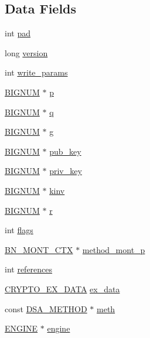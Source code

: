 \subsection*{Data Fields}
\begin{DoxyCompactItemize}
\item 
int \hyperlink{structdsa__st_af1d40a330bc745f51d8b079c9dc473ff}{pad}
\item 
long \hyperlink{structdsa__st_a17afc5cf84cee4b2123665f28ce85c9f}{version}
\item 
int \hyperlink{structdsa__st_a636bec232abffe90c26bde0a196e4c2e}{write\+\_\+params}
\item 
\hyperlink{crypto_2ossl__typ_8h_a6fb19728907ec6515e4bfb716bffa141}{B\+I\+G\+N\+UM} $\ast$ \hyperlink{structdsa__st_a4ed2e531b9fd8a6ca6ad6804565299a7}{p}
\item 
\hyperlink{crypto_2ossl__typ_8h_a6fb19728907ec6515e4bfb716bffa141}{B\+I\+G\+N\+UM} $\ast$ \hyperlink{structdsa__st_a8d39f39e46b024184dc5a24c3901d32d}{q}
\item 
\hyperlink{crypto_2ossl__typ_8h_a6fb19728907ec6515e4bfb716bffa141}{B\+I\+G\+N\+UM} $\ast$ \hyperlink{structdsa__st_ada27d9fb07daaac14be19b4ce12a7400}{g}
\item 
\hyperlink{crypto_2ossl__typ_8h_a6fb19728907ec6515e4bfb716bffa141}{B\+I\+G\+N\+UM} $\ast$ \hyperlink{structdsa__st_aad713005343ebfb84e09a7441d655802}{pub\+\_\+key}
\item 
\hyperlink{crypto_2ossl__typ_8h_a6fb19728907ec6515e4bfb716bffa141}{B\+I\+G\+N\+UM} $\ast$ \hyperlink{structdsa__st_a7a27cca85dea48fc1c9086fe65651ec5}{priv\+\_\+key}
\item 
\hyperlink{crypto_2ossl__typ_8h_a6fb19728907ec6515e4bfb716bffa141}{B\+I\+G\+N\+UM} $\ast$ \hyperlink{structdsa__st_ae572b73b513755f46bd9bb97fb0bdcf3}{kinv}
\item 
\hyperlink{crypto_2ossl__typ_8h_a6fb19728907ec6515e4bfb716bffa141}{B\+I\+G\+N\+UM} $\ast$ \hyperlink{structdsa__st_acaf81cf110d1af000216b0bb5a57a919}{r}
\item 
int \hyperlink{structdsa__st_ac8bf36fe0577cba66bccda3a6f7e80a4}{flags}
\item 
\hyperlink{crypto_2ossl__typ_8h_aec902d353e00ced6d3fee6cd033a8bd0}{B\+N\+\_\+\+M\+O\+N\+T\+\_\+\+C\+TX} $\ast$ \hyperlink{structdsa__st_a1776a39a1c2f2f04681674ba90a74d66}{method\+\_\+mont\+\_\+p}
\item 
int \hyperlink{structdsa__st_a146fdb34d9a909e530adf8b189481195}{references}
\item 
\hyperlink{crypto_2ossl__typ_8h_a7eaff1c18057495d8af18f22d1370b51}{C\+R\+Y\+P\+T\+O\+\_\+\+E\+X\+\_\+\+D\+A\+TA} \hyperlink{structdsa__st_ac3e4fd59d6ee44a81f3a58114613c1e2}{ex\+\_\+data}
\item 
const \hyperlink{crypto_2ossl__typ_8h_a605b811328e2faab9b3c496ce21e0750}{D\+S\+A\+\_\+\+M\+E\+T\+H\+OD} $\ast$ \hyperlink{structdsa__st_a15d9e2d9b636f1dc128827bd890f94d2}{meth}
\item 
\hyperlink{crypto_2ossl__typ_8h_abac45b251498719318e60ab8d6192510}{E\+N\+G\+I\+NE} $\ast$ \hyperlink{structdsa__st_a4eb35fa252ec72ad7c53a4c8d30a7fd3}{engine}
\end{DoxyCompactItemize}


